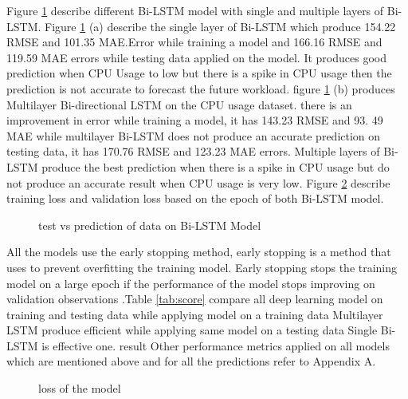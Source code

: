 Figure \ref{fig:Bilstem} describe different Bi-LSTM model with single and multiple layers of Bi-LSTM. Figure \ref{fig:Bilstem} (a) describe the single layer of Bi-LSTM which produce 154.22 RMSE and 101.35 MAE.Error while training a model and 166.16 RMSE and 119.59 MAE errors while testing data applied on the model. It produces good prediction when CPU Usage to low but there is a spike in CPU usage then the prediction is not accurate to forecast the future workload. figure \ref{fig:Bilstem} (b) produces Multilayer Bi-directional LSTM on the CPU usage dataset. there is an improvement in error while training a model, it has 143.23 RMSE and 93. 49 MAE while multilayer Bi-LSTM does not produce an accurate prediction on testing data, it has 170.76 RMSE and 123.23 MAE errors. Multiple layers of Bi-LSTM produce the best prediction when there is a spike in CPU usage but do not produce an accurate result when CPU usage is very low. Figure \ref{fig:Bilstemloss} describe training loss and validation loss based on the epoch of both Bi-LSTM model.
\begin{figure}[htp]




\caption{test vs prediction of data on Bi-LSTM Model }
\label{fig:Bilstem}
\end{figure}
All the models use the early stopping method,  early stopping is a method that uses to prevent overfitting the training model. Early stopping stops the training model on a large epoch if the performance of the model stops improving on validation observations \cite{guan2019predicting}.Table \ref{tab:score} compare all deep learning model on training and testing data while applying model on a training data Multilayer LSTM produce efficient while applying same model on a testing data Single Bi-LSTM is effective one.  result  Other performance metrics applied on all models which are mentioned above and for all the predictions refer to Appendix A.
\begin{figure}[htp]




\caption{loss of  the model }
\label{fig:Bilstemloss}
\end{figure}


